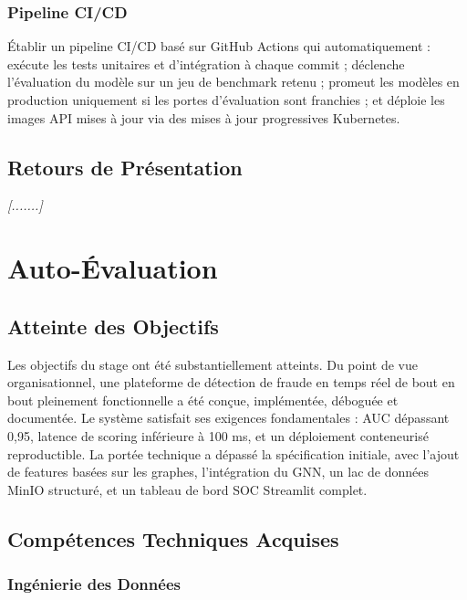 \documentclass[12pt,a4paper,oneside]{book}
\theoremstyle{definition}
\theoremstyle{plain}
\begin{document}
\subsection{Pipeline CI/CD}

Établir un pipeline CI/CD basé sur GitHub Actions qui automatiquement : exécute les tests unitaires et d'intégration à chaque commit ; déclenche l'évaluation du modèle sur un jeu de benchmark retenu ; promeut les modèles en production uniquement si les portes d'évaluation sont franchies ; et déploie les images API mises à jour via des mises à jour progressives Kubernetes.

\section{Retours de Présentation}

\noindent\textit{[.......]}

\chapter{Auto-Évaluation}
\label{chap:self}

\section{Atteinte des Objectifs}

Les objectifs du stage ont été substantiellement atteints. Du point de vue organisationnel, une plateforme de détection de fraude en temps réel de bout en bout pleinement fonctionnelle a été conçue, implémentée, déboguée et documentée. Le système satisfait ses exigences fondamentales : AUC dépassant 0,95, latence de scoring inférieure à 100 ms, et un déploiement conteneurisé reproductible. La portée technique a dépassé la spécification initiale, avec l'ajout de features basées sur les graphes, l'intégration du GNN, un lac de données MinIO structuré, et un tableau de bord SOC Streamlit complet.

\section{Compétences Techniques Acquises}

\subsection{Ingénierie des Données}
\end{document}
